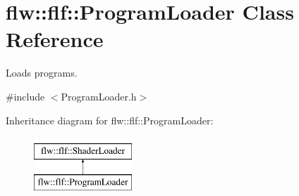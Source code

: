 \hypertarget{classflw_1_1flf_1_1ProgramLoader}{}\section{flw\+:\+:flf\+:\+:Program\+Loader Class Reference}
\label{classflw_1_1flf_1_1ProgramLoader}


Loads programs.  




{\ttfamily \#include $<$Program\+Loader.\+h$>$}

Inheritance diagram for flw\+:\+:flf\+:\+:Program\+Loader\+:\begin{figure}[H]
\begin{center}
\leavevmode
\includegraphics[height=2.000000cm]{classflw_1_1flf_1_1ProgramLoader}
\end{center}
\end{figure}
